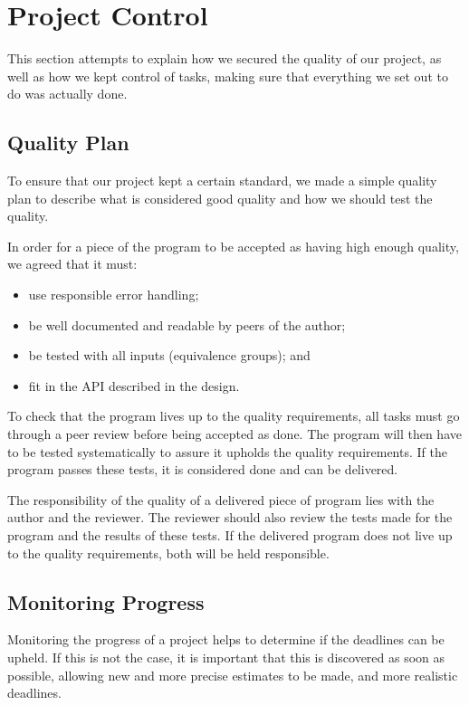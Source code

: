 \section{Project Control}
\label{sec:EmpiriControl}
This section attempts to explain how we secured the quality of our project, as well as how we kept control of tasks, making sure that everything we set out to do was actually done.

\subsection{Quality Plan}
\label{sec:EmpiriQualityControl}
To ensure that our project kept a certain standard, we made a simple quality plan to describe what is considered good quality and how we should test the quality.

In order for a piece of the program to be accepted as having high enough quality, we
agreed that it must:

\begin{itemize}
    \item use responsible error handling;
    \item be well documented and readable by peers of the author;
    \item be tested with all inputs (equivalence groups); and
    \item fit in the API described in the design.
\end{itemize}

To check that the program lives up to the quality requirements, all tasks must go through a peer review before being accepted as done. The program will then have to be tested systematically to assure it upholds the quality requirements. If the program passes these tests, it is considered done and can be delivered.

The responsibility of the quality of a delivered piece of program lies with the author
and the reviewer. The reviewer should also review the tests made for the program and
the results of these tests. If the delivered program does not live up to the quality
requirements, both will be held responsible.

\subsection{Monitoring Progress}
\label{sec:EmpiriProgress}

Monitoring the progress of a project helps to determine if the deadlines can be upheld.
If this is not the case, it is important that this is discovered as soon as possible,
allowing new and more precise estimates to be made, and more realistic deadlines.

